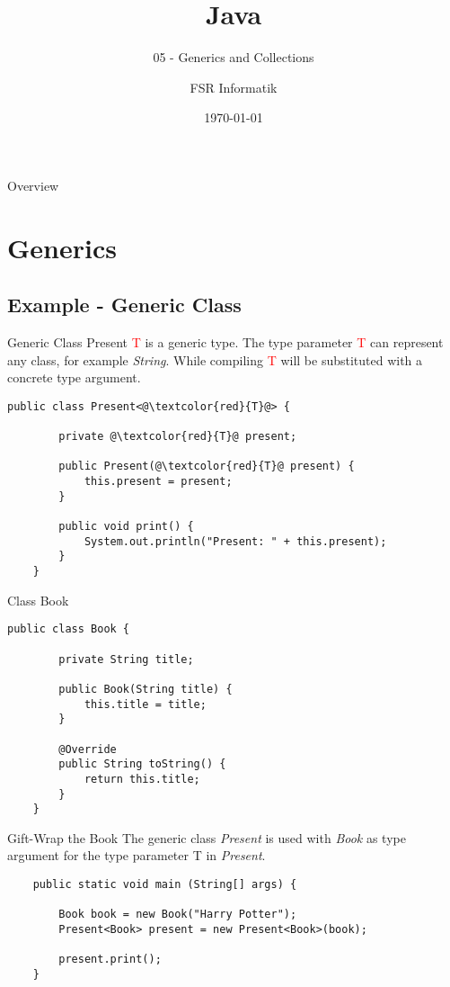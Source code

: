 

\title{Java}
\subtitle{05 - Generics and Collections}
\author{FSR Informatik}
\date{\today}



\begin{frame}
\titlepage
\end{frame}
\begin{frame}{Overview}
\tableofcontents
\end{frame}

\section{Generics}
\subsection{Example - Generic Class}
\begin{frame}[fragile]{Generic Class Present}
	\textcolor{red}{T} is a generic type. 
	The type parameter \textcolor{red}{T} can represent any class, for example \emph{String}.
	While compiling \textcolor{red}{T} will be substituted with a concrete type argument.
	\begin{lstlisting}[basicstyle=\ttfamily\scriptsize]
	public class Present<@\textcolor{red}{T}@> {
	    
	    private @\textcolor{red}{T}@ present;
	    
	    public Present(@\textcolor{red}{T}@ present) {
	        this.present = present;
	    }
	    
	    public void print() {
	        System.out.println("Present: " + this.present);
	    }
	}
	\end{lstlisting}	
\end{frame}

\begin{frame}[fragile]{Class Book}
	\begin{lstlisting}[escapechar=!]
	public class Book {
	    
	    private String title;
	    
	    public Book(String title) {
	        this.title = title;
	    }
	    
	    @Override
	    public String toString() {
	        return this.title;
	    }
	}
	\end{lstlisting}	
\end{frame}

\begin{frame}[fragile]{Gift-Wrap the Book}
	The generic class \emph{Present} is used with \emph{Book} as type argument
	for the type parameter T in \emph{Present}.
	\vfill
	\begin{lstlisting}
	public static void main (String[] args) {
	    
	    Book book = new Book("Harry Potter");	    
	    Present<Book> present = new Present<Book>(book);
	    
	    present.print();
	}
	\end{lstlisting}
\end{frame}

